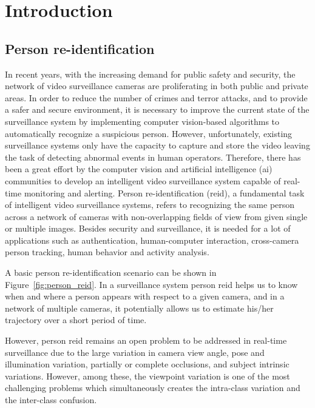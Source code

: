 \chapter{Introduction}\label{intro}
\section{Person re-identification}
In recent years, with the increasing demand for public safety and security, the network of video surveillance cameras are proliferating in both public and private areas. In order to reduce the number of crimes and terror attacks, and to provide a safer and secure environment, it is necessary to improve the current state of the surveillance system by implementing computer vision-based algorithms to automatically recognize a suspicious person. However, unfortunately, existing surveillance systems only have the capacity to capture and store the video leaving the task of detecting abnormal events in human operators. Therefore, there has been a great effort by the computer vision and artificial intelligence (\gls{ai}) communities to develop an intelligent video surveillance system capable of real-time monitoring and alerting. Person re-identification (\gls{reid}), a fundamental task of intelligent video surveillance systems, refers to recognizing the same person across a network of cameras with non-overlapping fields of view from given single or multiple images. Besides security and surveillance, it is needed for a lot of applications such as authentication, human-computer interaction, cross-camera person tracking, human behavior and activity analysis. 

A basic person re-identification scenario can be shown in Figure~\ref{fig:person_reid}. In a surveillance system person \gls{reid} helps us to know when and where a person appears with respect to a given camera, and in a network of multiple cameras, it potentially allows us to estimate his/her trajectory over a short period of time. 

However, person \gls{reid} remains an open problem to be addressed in real-time surveillance due to the large variation in camera view angle, pose and illumination variation, partially or complete occlusions, and subject intrinsic variations. However, among these, the viewpoint variation is one of the most challenging problems which simultaneously creates the intra-class variation and the inter-class confusion.


